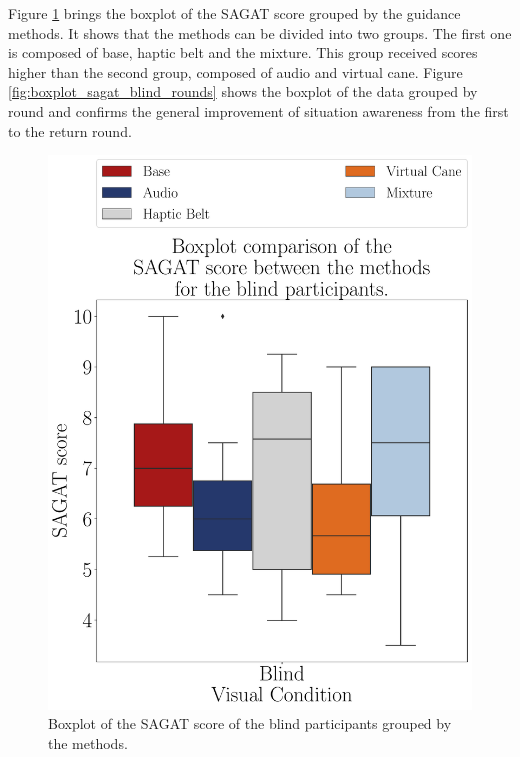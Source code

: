 Figure \ref{fig:boxplot_sagat_blind_scene} brings the boxplot of the SAGAT score grouped by the guidance methods. It shows that the methods can be divided into two groups. The first one is composed of base, haptic belt and the mixture. This group received scores higher than the second group, composed of audio and virtual cane. Figure \ref{fig:boxplot_sagat_blind_rounds} shows the boxplot of the data grouped by round and confirms the general improvement of situation awareness from the first to the return round. 

\begin{figure}[!htb]
    \centering
    \begin{minipage}{0.45\textwidth}
        \centering
        \includegraphics[width = \textwidth]{Resultados/Sagat/Figuras/pdf/boxplot_sagat_blind_scene.pdf}
        \caption{Boxplot of the SAGAT score of the blind participants grouped by the methods.}
        \label{fig:boxplot_sagat_blind_scene}
    \end{minipage}

\end{figure}

